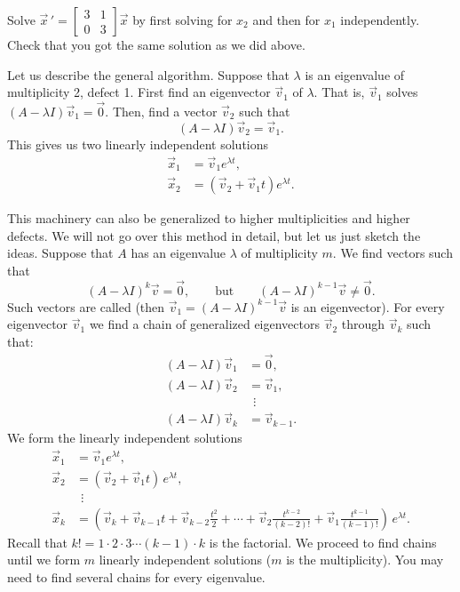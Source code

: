 \documentclass[12pt]{book}
\begin{document}
\begin{exercise}
Solve ${\vec{x}\,}' = \left[ \begin{smallmatrix}
3 & 1 \\ 0 & 3
\end{smallmatrix} \right] \vec{x}$ by first solving for $x_2$ and then for
$x_1$ independently.  Check that you got the same solution as we did
above.
\end{exercise}

Let us describe the general algorithm.  Suppose that $\lambda$ is an
eigenvalue of multiplicity 2, defect 1.
First find an eigenvector $\vec{v}_1$ of $\lambda$.  
That is, $\vec{v}_1$ solves
$(A-\lambda I)\vec{v}_1  = \vec{0}$.
Then, find a vector $\vec{v}_2$ such that
\begin{equation*}
(A-\lambda I)\vec{v}_2 = \vec{v}_1 .
\end{equation*}
This gives us two linearly independent solutions
\begin{align*}
\vec{x}_1 & = \vec{v}_1 e^{\lambda t} , \\
\vec{x}_2 & = \left( \vec{v}_2 + \vec{v}_1 t \right) e^{\lambda t} .
\end{align*}

\medskip

This machinery can also be generalized to higher multiplicities
and higher defects.
We will not go over this method in detail, but let us just sketch the ideas.  Suppose that $A$
has an eigenvalue $\lambda$ of multiplicity $m$.
We find vectors such that
\begin{equation*}
{(A - \lambda I)}^k \vec{v} = \vec{0},
\qquad \text{but} \qquad
{(A - \lambda I)}^{k-1} \vec{v} \not= \vec{0}.
\end{equation*}
Such vectors are called \emph{} (then
$\vec{v}_1 = {(A - \lambda I)}^{k-1} \vec{v}$ is an eigenvector).
For every
eigenvector $\vec{v}_1$ we find a chain of generalized eigenvectors
$\vec{v}_2$ through $\vec{v}_k$ such that:
\begin{align*}
(A - \lambda I) \vec{v}_1 & = \vec{0} , \\
(A - \lambda I) \vec{v}_2 & = \vec{v}_1 , \\
& ~~\vdots \\
(A - \lambda I) \vec{v}_k & = \vec{v}_{k-1} .
\end{align*}
We form the linearly independent solutions
\begin{align*}
\vec{x}_1 & = \vec{v}_1 e^{\lambda t} , \\
\vec{x}_2 & = ( \vec{v}_2 + \vec{v}_1 t ) \, e^{\lambda t} , \\
& ~~\vdots \\
\vec{x}_k & = \left( \vec{v}_k + \vec{v}_{k-1} t +
\vec{v}_{k-2} \frac{t^2}{2} +
\cdots + \vec{v}_2 \frac{t^{k-2}}{(k-2)!} + \vec{v}_1 \frac{t^{k-1}}{(k-1)!}
\right) \, e^{\lambda t} .
\end{align*}
Recall that $k! = 1 \cdot 2 \cdot 3 \cdots (k-1) \cdot k$ is the factorial.
We proceed to find chains until we form $m$ linearly independent solutions
($m$ is the multiplicity).  You may need to find several chains for every
eigenvalue.
\end{document}

